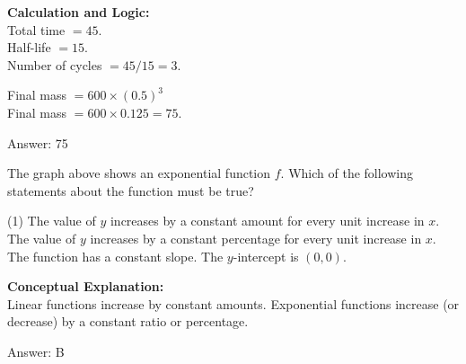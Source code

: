 \documentclass[11pt,paper=a4,answers]{exam}
\begin{document}
\begin{questions}
\begin{solution}
\vspace{20pt}

\textbf{Calculation and Logic:} \\
Total time $= 45$. \\
Half-life $= 15$. \\
Number of cycles $= 45 / 15 = 3$.

\vspace{10pt}

Final mass $= 600 \times (0.5)^3$ \\
Final mass $= 600 \times 0.125 = 75$.

\vspace{25pt}

Answer: \colorbox{yellow!100}{75}
\end{solution}

\vspace{40pt}

\question
\begin{center}
\end{center}
The graph above shows an exponential function $f$. Which of the following statements about the function must be true?
\begin{tasks}(1)
    \task The value of $y$ increases by a constant amount for every unit increase in $x$.
    \task The value of $y$ increases by a constant percentage for every unit increase in $x$.
    \task The function has a constant slope.
    \task The $y$-intercept is $(0, 0)$.
\end{tasks}

\begin{solution}
\textbf{Conceptual Explanation:} \\
Linear functions increase by constant amounts. Exponential functions increase (or decrease) by a constant ratio or percentage.

\vspace{25pt}

Answer: \colorbox{yellow!100}{B}
\end{solution}

\vspace{40pt}


\end{questions}
\end{document}
